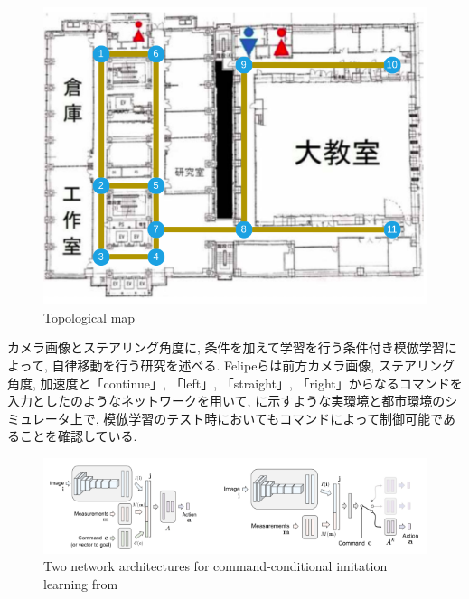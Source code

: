 \begin{figure}[hbtp]
     \centering
    \includegraphics[keepaspectratio, scale=0.45]
         {images/tsudanuma.png}
    \caption{Topological map}
    \label{Fig:tsudanuma}
\end{figure}

カメラ画像とステアリング角度に, 条件を加えて学習を行う条件付き模倣学習によって, 自律移動を行う研究を述べる. Felipeら\cite{felipe}は前方カメラ画像, ステアリング角度, 加速度と「continue」, 「left」, 「straight」, 「right」からなるコマンドを入力としたのようなネットワークを用いて, に示すような実環境と都市環境のシミュレータ上で, 模倣学習のテスト時においてもコマンドによって制御可能であることを確認している.

\vspace{0.5cm}

\begin{figure}[hbtp]
     \centering
    \includegraphics[keepaspectratio, scale=0.65]
         {images/felipe_network.png}
    \caption{Two network architectures for command-conditional imitation learning from \cite{felipe}}
    \label{Fig:felipe_network}
\end{figure}

